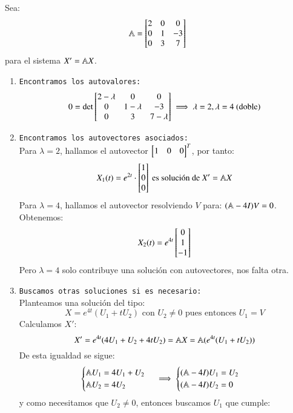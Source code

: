 \begin{eg}\label{eg:cal-sol-indep-lin-sis}
    Sea:
    $$
        \A = \mx{2 & 0 & 0\\ 0 & 1 & -3\\0 & 3 & 7}
    $$ para el sistema $X' = \mathbb{A} X$.
    \begin{enumerate}
        \item \texttt{Encontramos los autovalores:}\\
        $$
        0 = \det\mx{2-\lambda & 0 & 0\\ 0 & 1-\lambda & -3\\0 & 3 & 7-\lambda} \implies \lambda = 2, \lambda = 4 \text{ (doble)}
        $$
        \item \texttt{Encontramos los autovectores asociados:}\\
        Para $\lambda = 2$, hallamos el autovector $\mx{1 & 0 & 0}^T$, por tanto:
        $$
            X_1(t) = e^{2t}\cdot \mx{1 \\ 0 \\ 0} \text{ es solución de $X' = \A X$}
        $$
        Para $\lambda = 4$, hallamos el autovector resolviendo $V$ para: $(\mathbb{A} - 4I) V = 0$. Obtenemos:
        $$
            X_2(t) = e^{4t}\mx{0 \\ 1 \\ -1}
        $$
        Pero $\lambda = 4$ solo contribuye una solución con autovectores, nos falta otra.
        \item \texttt{Buscamos otras soluciones si es necesario:}\\
        Planteamos una solución del tipo:
        $$
            X = e^{4t}(U_1 + t U_2) \text{ con } U_2 \neq 0 \text{ pues entonces $U_1 = V$}
        $$
        Calculamos $X'$:
        $$
            X' = e^{4t} (4 U_1 + U_2 + 4tU_2) = \mathbb{A} X = \mathbb{A} (e^{4t} (U_1 + t U_2))
        $$
        De esta igualdad se sigue:
        $$
            \begin{cases}
                \mathbb{A} U_1 = 4 U_1 + U_2\\
                \mathbb{A} U_2 = 4 U_2
            \end{cases} \implies
            \begin{cases}
                (\mathbb{A} - 4 I) U_1 = U_2\\
                (\mathbb{A} - 4 I) U_2 = 0
            \end{cases}
        $$
        y como necesitamos que $U_2 \neq 0$, entonces buscamos $U_1$ que cumple:

\end{enumerate}
\end{eg}
